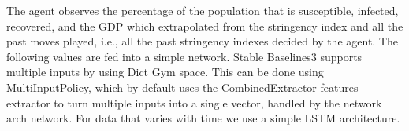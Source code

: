 \documentclass[tikz,fleqn,12pt]{wlscirep}
\begin{document}
The agent observes the percentage of the population that is susceptible, infected, recovered, and the GDP which extrapolated from the stringency index and all the past moves played, i.e., all the past stringency indexes decided by the agent. The following values are fed into a simple network. Stable Baselines3 supports multiple inputs by using Dict Gym space. This can be done using MultiInputPolicy, which by default uses the CombinedExtractor features extractor to turn multiple inputs into a single vector, handled by the network arch network. For data that varies with time we use a simple LSTM architecture.

\end{document}
